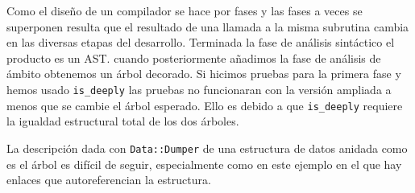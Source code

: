 Como el diseño de un compilador se hace por fases 
y las fases a veces se superponen resulta que el resultado
de una llamada a la misma subrutina cambia en las diversas etapas del desarrollo.
Terminada la fase de análisis sintáctico el producto es un AST.
cuando posteriormente añadimos la fase de análisis de ámbito
obtenemos un árbol decorado. Si hicimos pruebas para la primera fase y hemos
usado \verb|is_deeply| las pruebas no funcionaran con la versión ampliada
a menos que se cambie el árbol esperado. Ello es debido 
a que \verb|is_deeply| requiere la igualdad estructural total 
de los dos árboles.

\label{section:limitacionesdedumper}

La descripción dada con \verb|Data::Dumper| de una estructura 
de datos anidada como es el árbol es difícil de seguir,
especialmente como en este ejemplo
en el que hay enlaces que autoreferencian la estructura.


